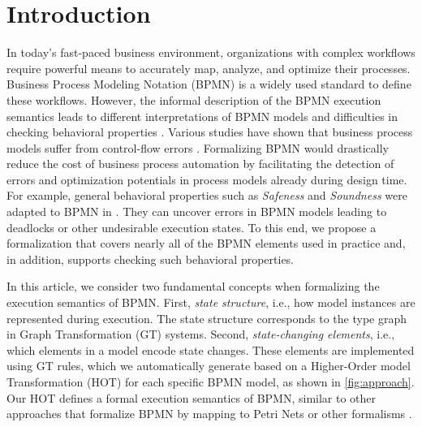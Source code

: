\documentclass{lmcs} %
\begin{document}
\section{Introduction} \label{sec:introduction}
In today's fast-paced business environment, organizations with complex workflows require powerful means to accurately map, analyze, and optimize their processes. 
Business Process Modeling Notation (BPMN) \cite{objectmanagementgroupBusinessProcessModel2013} is a widely used standard to define these workflows.
However, the informal description of the BPMN execution semantics leads to different interpretations of BPMN models and difficulties in checking behavioral properties \cite{corradiniFormalApproachAnalysis2021}.
Various studies have shown that business process models suffer from control-flow errors \cite{mendlingEmpiricalStudiesProcess2009}.
Formalizing BPMN would drastically reduce the cost of business process automation by facilitating the detection of errors and optimization potentials in process models already during design time.
For example, general behavioral properties such as \textit{Safeness} and \textit{Soundness} were adapted to BPMN in \cite{corradiniClassificationBPMNCollaborations2018}.
They can uncover errors in BPMN models leading to deadlocks or other undesirable execution states.
To this end, we propose a formalization that covers nearly all of the BPMN elements used in practice and, in addition, supports checking such behavioral properties.

In this article, we consider two fundamental concepts when formalizing the execution semantics of BPMN.
First, \textit{state structure}, i.e., how model instances are represented during execution.
The state structure corresponds to the type graph in Graph Transformation (GT) systems.
Second, \textit{state-changing elements}, i.e., which elements in a model encode state changes.
These elements are implemented using GT rules, which we automatically generate based on a Higher-Order model Transformation (HOT) \cite{tisiUseHigherOrderModel2009} for each specific BPMN model, as shown in \autoref{fig:approach}.
Our HOT defines a formal execution semantics of BPMN, similar to other approaches that formalize BPMN by mapping to Petri Nets or other formalisms \cite{dijkmanSemanticsAnalysisBusiness2008}.
\end{document}
